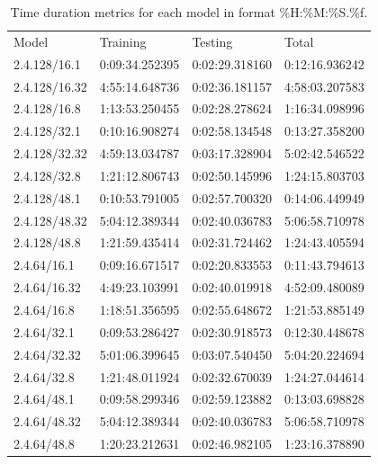 \documentclass[12pt]{article}
\begin{document}
\begin{table}[H]
\centering
\begin{tabular}{llll}
Model & Training & Testing & Total \\
  2.4.128/16.1    &      0:09:34.252395       &     0:02:29.318160       &     0:12:16.936242        \\
  2.4.128/16.32    &      4:55:14.648736       &     0:02:36.181157       &     4:58:03.207583        \\
  2.4.128/16.8    &      1:13:53.250455       &     0:02:28.278624       &     1:16:34.098996        \\
  2.4.128/32.1    &      0:10:16.908274       &     0:02:58.134548       &     0:13:27.358200        \\
  2.4.128/32.32    &      4:59:13.034787       &     0:03:17.328904       &     5:02:42.546522        \\
  2.4.128/32.8    &      1:21:12.806743       &     0:02:50.145996       &     1:24:15.803703        \\
  2.4.128/48.1    &      0:10:53.791005       &     0:02:57.700320       &     0:14:06.449949        \\
  2.4.128/48.32    &      5:04:12.389344       &     0:02:40.036783       &     5:06:58.710978        \\
  2.4.128/48.8    &      1:21:59.435414       &     0:02:31.724462       &     1:24:43.405594        \\
  2.4.64/16.1    &      0:09:16.671517       &     0:02:20.833553       &     0:11:43.794613        \\
  2.4.64/16.32    &      4:49:23.103991       &     0:02:40.019918       &     4:52:09.480089        \\
  2.4.64/16.8    &      1:18:51.356595       &     0:02:55.648672       &     1:21:53.885149        \\
  2.4.64/32.1    &      0:09:53.286427       &     0:02:30.918573       &     0:12:30.448678        \\
  2.4.64/32.32    &      5:01:06.399645       &     0:03:07.540450       &     5:04:20.224694        \\
  2.4.64/32.8    &      1:21:48.011924       &     0:02:32.670039       &     1:24:27.044614        \\
  2.4.64/48.1    &      0:09:58.299346       &     0:02:59.123882       &     0:13:03.698828        \\
  2.4.64/48.32    &      5:04:12.389344       &     0:02:40.036783       &     5:06:58.710978        \\
  2.4.64/48.8    &      1:20:23.212631       &     0:02:46.982105       &     1:23:16.378890        \\
\end{tabular}
\caption{Time duration metrics for each model in format \%H:\%M:\%S.\%f.}
\label{tab:my-table}
\end{table}
\end{document}
